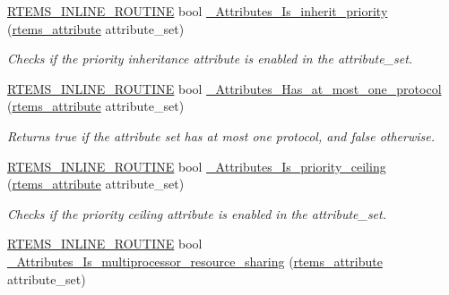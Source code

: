 \begin{DoxyCompactItemize}
\mbox{\hyperlink{group__RTEMSScoreBaseDefs_gac216239df231d5dbd15e3520b0b9313f}{R\+T\+E\+M\+S\+\_\+\+I\+N\+L\+I\+N\+E\+\_\+\+R\+O\+U\+T\+I\+NE}} bool \mbox{\hyperlink{group__ClassicAttributesImpl_ga1a916295ab386150a3afcce8259e11a4}{\+\_\+\+Attributes\+\_\+\+Is\+\_\+inherit\+\_\+priority}} (\mbox{\hyperlink{group__ClassicAttributes_gaea40313cf78ed843e09c4315d0a10f79}{rtems\+\_\+attribute}} attribute\+\_\+set)
\begin{DoxyCompactList}\small\item\em Checks if the priority inheritance attribute is enabled in the attribute\+\_\+set. \end{DoxyCompactList}\item 
\mbox{\hyperlink{group__RTEMSScoreBaseDefs_gac216239df231d5dbd15e3520b0b9313f}{R\+T\+E\+M\+S\+\_\+\+I\+N\+L\+I\+N\+E\+\_\+\+R\+O\+U\+T\+I\+NE}} bool \mbox{\hyperlink{group__ClassicAttributesImpl_gae2a3aee90c04eff42efa771aedcec1cf}{\+\_\+\+Attributes\+\_\+\+Has\+\_\+at\+\_\+most\+\_\+one\+\_\+protocol}} (\mbox{\hyperlink{group__ClassicAttributes_gaea40313cf78ed843e09c4315d0a10f79}{rtems\+\_\+attribute}} attribute\+\_\+set)
\begin{DoxyCompactList}\small\item\em Returns true if the attribute set has at most one protocol, and false otherwise. \end{DoxyCompactList}\item 
\mbox{\hyperlink{group__RTEMSScoreBaseDefs_gac216239df231d5dbd15e3520b0b9313f}{R\+T\+E\+M\+S\+\_\+\+I\+N\+L\+I\+N\+E\+\_\+\+R\+O\+U\+T\+I\+NE}} bool \mbox{\hyperlink{group__ClassicAttributesImpl_gaafe8766d35f2cf356ddfddc16e3ad573}{\+\_\+\+Attributes\+\_\+\+Is\+\_\+priority\+\_\+ceiling}} (\mbox{\hyperlink{group__ClassicAttributes_gaea40313cf78ed843e09c4315d0a10f79}{rtems\+\_\+attribute}} attribute\+\_\+set)
\begin{DoxyCompactList}\small\item\em Checks if the priority ceiling attribute is enabled in the attribute\+\_\+set. \end{DoxyCompactList}\item 
\mbox{\hyperlink{group__RTEMSScoreBaseDefs_gac216239df231d5dbd15e3520b0b9313f}{R\+T\+E\+M\+S\+\_\+\+I\+N\+L\+I\+N\+E\+\_\+\+R\+O\+U\+T\+I\+NE}} bool \mbox{\hyperlink{group__ClassicAttributesImpl_ga91bbfa6716bee0b1f32c25cc685baef4}{\+\_\+\+Attributes\+\_\+\+Is\+\_\+multiprocessor\+\_\+resource\+\_\+sharing}} (\mbox{\hyperlink{group__ClassicAttributes_gaea40313cf78ed843e09c4315d0a10f79}{rtems\+\_\+attribute}} attribute\+\_\+set)

\end{DoxyCompactItemize}
